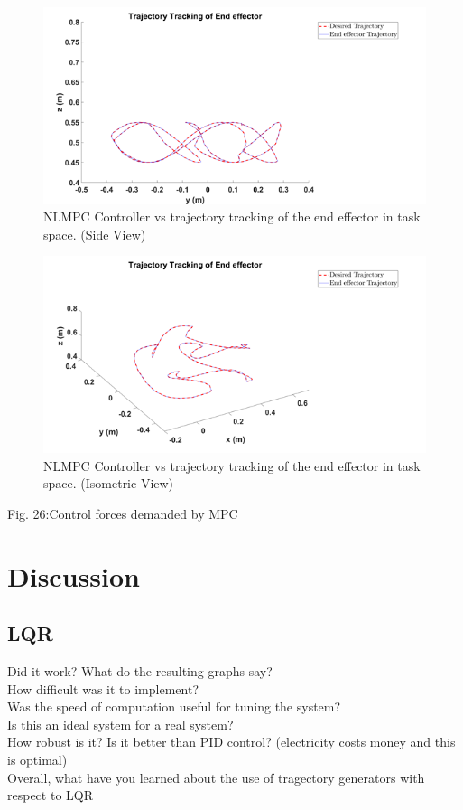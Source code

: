 \documentclass{UoNMCHA}
\numberwithin{equation}{section}
\begin{document}
	\begin{figure}[H]
		\begin{center}
			\includegraphics[width=.8\linewidth]{figs/Picture392}
			\caption{NLMPC Controller vs trajectory tracking of the end effector in task space. (Side View)}
			\label{figs/Picture382}
		\end{center}
	\end{figure}
	
	\begin{figure}[H]
		\begin{center}
			\includegraphics[width=.8\linewidth]{figs/Picture393}
			\caption{NLMPC Controller vs trajectory tracking of the end effector in task space. (Isometric View)}
			\label{figs/Picture383}
		\end{center}
	\end{figure}
	Fig. 26:Control forces demanded by MPC
	
	
	\newpage
	\section{Discussion}
	
	\subsection{LQR}
	
	Did it work? What do the resulting graphs say?\\
	How difficult was it to implement?\\
	Was the speed of computation useful for tuning the system?\\
	Is this an ideal system for a real system?\\
	How robust is it? Is it better than PID control? (electricity costs money and this is optimal)\\
	Overall, what have you learned about the use of tragectory generators with respect to LQR\\
	
\end{document}
